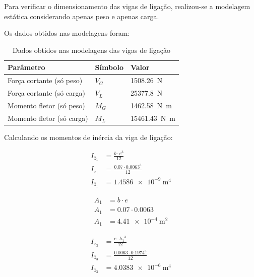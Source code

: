 Para verificar o dimensionamento das vigas de ligação, realizou-se a modelagem estática considerando apenas peso e apenas carga.

Os dados obtidos nas modelagens foram:

\begin{table}[H]
  \centering
  \caption{Dados obtidos nas modelagens das vigas de ligação}
  \label{tab:dados_modelagens_vigas_de_ligacao}
  \begin{tabularx}{\textwidth}{>{\centering\arraybackslash}X>{\centering\arraybackslash}X>{\centering\arraybackslash}X}
    \toprule
    Parâmetro                 & Símbolo & Valor                        \\
    \midrule
    Força cortante (só peso)  & $V_G$   & \SI{1508.26}{\newton}        \\
    Força cortante (só carga) & $V_L$   & \SI{25377.8}{\newton}        \\
    Momento fletor (só peso)  & $M_G$   & \SI{1462.58}{\newton\meter}  \\
    Momento fletor (só carga) & $M_L$   & \SI{15461.43}{\newton\meter} \\
    \bottomrule
  \end{tabularx}
\end{table}

Calculando os momentos de inércia da viga de ligação:

\begin{align*}
  I_{\overline{z}_1} & = \frac{b \cdot e^3}{12}                     \\
  I_{\overline{z}_1} & = \frac{\num{0.07} \cdot \num{0.0063}^3}{12} \\
  I_{\overline{z}_1} & = \boxed{\SI{1.4586e-9}{\meter^4}}
\end{align*}

\begin{align*}
  A_1 & = b \cdot e                      \\
  A_1 & = \num{0.07} \cdot \num{0.0063}  \\
  A_1 & = \boxed{\SI{4.41e-4}{\meter^2}}
\end{align*}

\begin{align*}
  I_{\overline{z}_3} & = \frac{e \cdot {h_1}^3}{12}                   \\
  I_{\overline{z}_3} & = \frac{\num{0.0063} \cdot \num{0.1974}^3}{12} \\
  I_{\overline{z}_3} & = \boxed{\SI{4.0383e-6}{\meter^4}}
\end{align*}

